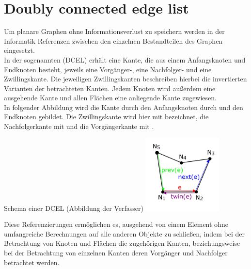 \section{Doubly connected edge list}
Um planare Graphen ohne Informationsverlust zu speichern werden in der Informatik Referenzen zwischen den einzelnen Bestandteilen des Graphen eingesetzt. \\
In der sogenannten  (DCEL) erhält eine Kante, die aus einem Anfangsknoten und Endknoten besteht, jeweils eine Vorgänger-, eine Nachfolger- und eine Zwillingskante. 
Die jeweiligen Zwillingskanten beschreiben hierbei die invertierten Varianten der betrachteten Kanten.
Jedem Knoten wird außerdem eine ausgehende Kante und allen Flächen eine anliegende Kante zugewiesen. \\
In folgender Abbildung wird die Kante  durch den Anfangsknoten durch  und den Endknoten  gebildet.
Die Zwillingskante wird hier mit  bezeichnet, die Nachfolgerkante mit  und die Vorgängerkante mit .
\begin{Bild}{Schema einer DCEL (Abbildung der Verfasser)}
	\includegraphics[width=150px]{Bilder/DCEL_Scheme}
\end{Bild}
Diese Referenzierungen ermöglichen es, ausgehend von einem Element ohne umfangreiche Berechnungen auf alle anderen Objekte zu schließen, indem bei der Betrachtung von Knoten und Flächen die zugehörigen Kanten, beziehungsweise bei der Betrachtung von einzelnen Kanten deren Vorgänger und Nachfolger betrachtet werden.


